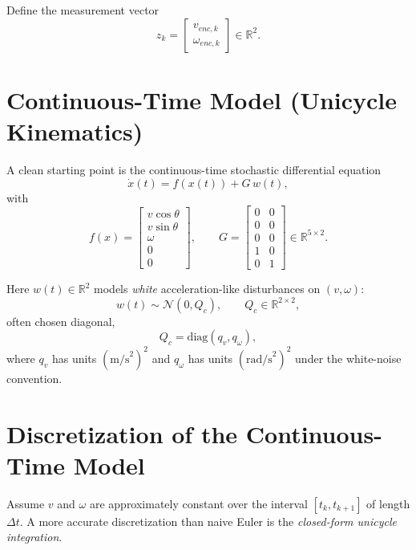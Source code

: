 \documentclass[11pt]{article}
\begin{document}
Define the measurement vector
\begin{equation}
z_k =
\begin{bmatrix}
v_{enc,k} \\
\omega_{enc,k}
\end{bmatrix}
\in \mathbb{R}^{2}.
\end{equation}

\section*{Continuous-Time Model (Unicycle Kinematics)}

A clean starting point is the continuous-time stochastic differential equation
\begin{equation}
\dot{x}(t) = f(x(t)) + G\,w(t),
\end{equation}
with
\begin{equation}
f(x)=
\begin{bmatrix}
v\cos\theta \\
v\sin\theta \\
\omega \\
0 \\
0
\end{bmatrix},
\qquad
G =
\begin{bmatrix}
0 & 0\\
0 & 0\\
0 & 0\\
1 & 0\\
0 & 1
\end{bmatrix}
\in \mathbb{R}^{5\times 2}.
\end{equation}

Here $w(t)\in\mathbb{R}^2$ models \emph{white} acceleration-like disturbances on $(v,\omega)$:
\begin{equation}
w(t) \sim \mathcal{N}(0,Q_c), \qquad Q_c \in \mathbb{R}^{2\times 2},
\end{equation}
often chosen diagonal,
\begin{equation}
Q_c = \mathrm{diag}(q_v, q_\omega),
\end{equation}
where $q_v$ has units $(\text{m/s}^2)^2$ and $q_\omega$ has units $(\text{rad/s}^2)^2$ under the white-noise convention.

\section*{Discretization of the Continuous-Time Model}

Assume $v$ and $\omega$ are approximately constant over the interval $[t_k,t_{k+1}]$ of length $\Delta t$.
A more accurate discretization than naive Euler is the \emph{closed-form unicycle integration}.
\end{document}

